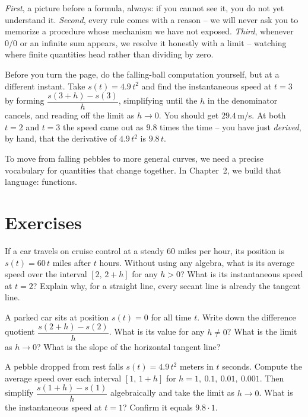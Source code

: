\begin{focusbox}
\emph{First}, a picture before a formula,
always: if you cannot see it, you do not yet understand it. \emph{Second}, every
rule comes with a reason -- we will never ask you to memorize a procedure whose
mechanism we have not exposed. \emph{Third}, whenever $0/0$ or an infinite sum appears, we resolve it honestly with a limit -- watching where finite quantities head rather than dividing by zero.
\end{focusbox}

\begin{labbox}
Before you turn the page, do the falling-ball computation yourself, but at a
different instant. Take $s(t) = 4.9\,t^2$ and find the instantaneous speed at
$t = 3$ by forming $\dfrac{s(3+h)-s(3)}{h}$, simplifying until the $h$ in the
denominator cancels, and reading off the limit as $h\to 0$. You should get
$29.4$\,m/s. At both $t=2$ and $t=3$ the speed came out as $9.8$ times the time
-- you have just \emph{derived}, by hand, that the derivative of $4.9\,t^2$ is
$9.8\,t$.
\end{labbox}

To move from falling pebbles to more general curves, we need a precise vocabulary
for quantities that change together. In Chapter~2, we build that language: functions.

\section*{Exercises}

\begin{exercise}
If a car travels on cruise control at a steady $60$ miles per hour, its position is
$s(t) = 60\,t$ miles after $t$ hours. Without using any algebra, what is its average
speed over the interval $[2,\,2+h]$ for any $h > 0$? What is its instantaneous speed
at $t = 2$? Explain why, for a straight line, every secant line is already the tangent line.
\end{exercise}

\begin{exercise}
A parked car sits at position $s(t) = 0$ for all time $t$. Write down the difference
quotient $\dfrac{s(2+h)-s(2)}{h}$. What is its value for any $h \neq 0$? What is the
limit as $h \to 0$? What is the slope of the horizontal tangent line?
\end{exercise}

\begin{exercise}
A pebble dropped from rest falls $s(t) = 4.9\,t^2$ meters in $t$ seconds.
Compute the average speed over each interval $[1,\,1+h]$ for $h = 1,\ 0.1,\
0.01,\ 0.001$. Then simplify $\dfrac{s(1+h)-s(1)}{h}$ algebraically and take the
limit as $h \to 0$. What is the instantaneous speed at $t=1$? Confirm it equals
$9.8\cdot 1$.
\end{exercise}

